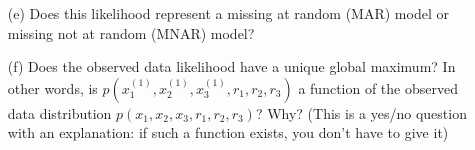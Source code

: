 \documentclass[11pt]{article}
\begin{document}
\begin{enumerate}
\begin{answertext}{3cm}{}
    
\end{answertext}


\item[(e)] Does this likelihood represent a missing at random (MAR) model or missing not at random (MNAR) model?

\begin{answertext}{3cm}{}
    
\end{answertext}


\item[(f)] Does the observed data likelihood have a unique global maximum?  In other words, 
 is $p(x_1^{(1)}, x_2^{(1)}, x_3^{(1)}, r_1, r_2, r_3)$ a function of the observed data distribution $p(x_1, x_2, x_3, r_1, r_2, r_3)$?  Why?  (This is a yes/no question with an explanation: if such a function exists, you don't have to give it)
 
\begin{answertext}{3cm}{}
    
\end{answertext}
\end{enumerate}


\pagebreak
\end{document}
